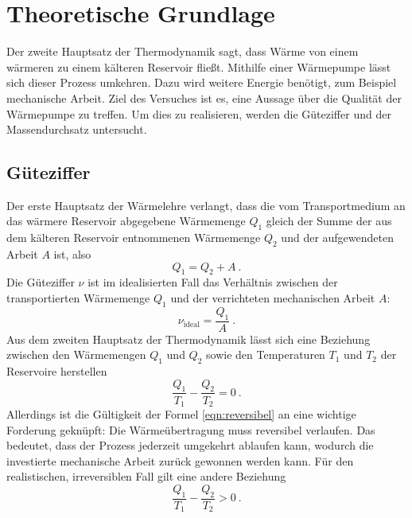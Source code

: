 \section{Theoretische Grundlage}
\label{sec:Theorie}

Der zweite Hauptsatz der Thermodynamik sagt, dass Wärme von einem wärmeren zu einem kälteren Reservoir fließt. Mithilfe einer Wärmepumpe lässt sich dieser Prozess umkehren. Dazu wird weitere Energie benötigt, zum Beispiel mechanische Arbeit. Ziel des Versuches ist es, eine Aussage über die Qualität der Wärmepumpe zu treffen. Um dies zu realisieren, werden die Güteziffer und der Massendurchsatz untersucht.

\subsection{Güteziffer}
Der erste Hauptsatz der Wärmelehre verlangt, dass die vom Transportmedium an das wärmere Reservoir abgegebene Wärmemenge $Q_\text{1}$ gleich der Summe der aus dem kälteren Reservoir entnommenen Wärmemenge $Q_\text{2}$ und der aufgewendeten Arbeit $A$ ist, also
\begin{equation}
	\label{eqn:Q1}
		Q_\text{1} = Q_\text{2} + A \ .
\end{equation}
Die Güteziffer $\nu$ ist im idealisierten Fall das Verhältnis zwischen der transportierten Wärmemenge $Q_\text{1}$ und der verrichteten mechanischen Arbeit $A$:
\begin{equation}
	\label{eqn:nu}
	\nu_\text{ideal} = \frac{Q_\text{1}}{A} \ .
\end{equation}
Aus dem zweiten Hauptsatz der Thermodynamik lässt sich eine Beziehung zwischen den Wärmemengen $Q_\text{1}$ und $Q_\text{2}$ sowie den Temperaturen $T_\text{1}$ und $T_\text{2}$ der Reservoire herstellen
\begin{equation}
	\label{eqn:reversibel}
	\frac{Q_\text{1}}{T_\text{1}} - \frac{Q_\text{2}}{T_\text{2}} = 0 \ .
\end{equation}
Allerdings ist die Gültigkeit der Formel \ref{eqn:reversibel} an eine wichtige Forderung geknüpft: Die Wärmeübertragung muss reversibel verlaufen. Das bedeutet, dass der Prozess jederzeit umgekehrt ablaufen kann, wodurch die investierte mechanische Arbeit zurück gewonnen werden kann. Für den realistischen, irreversiblen Fall gilt eine andere Beziehung
\begin{equation}
	\label{eqn:irreversibel}
	\frac{Q_\text{1}}{T_\text{1}} - \frac{Q_\text{2}}{T_\text{2}} > 0 \ .
\end{equation}
